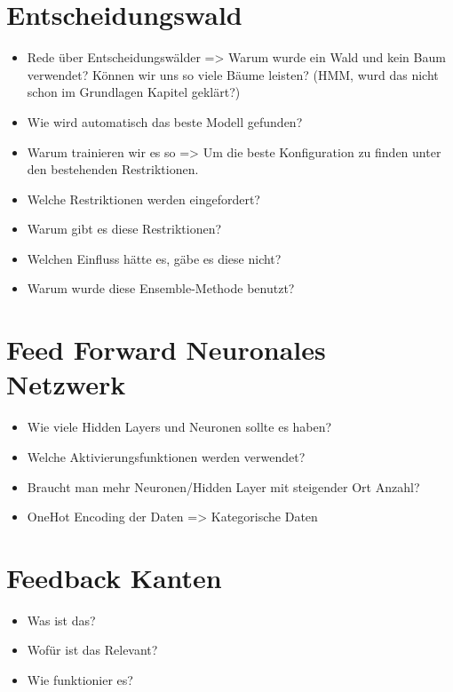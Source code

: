 \section{Entscheidungswald}
\begin{itemize}
    \item Rede über Entscheidungswälder => Warum wurde ein Wald und kein Baum verwendet? Können wir uns so viele Bäume leisten? (HMM, wurd das nicht schon im Grundlagen Kapitel geklärt?)
    \item Wie wird automatisch das beste Modell gefunden?
    \item Warum trainieren wir es so => Um die beste Konfiguration zu finden unter den bestehenden Restriktionen.
    \item Welche Restriktionen werden eingefordert?
    \item Warum gibt es diese Restriktionen?
    \item Welchen Einfluss hätte es, gäbe es diese nicht?
    \item Warum wurde diese Ensemble-Methode benutzt?
\end{itemize}

\section{Feed Forward Neuronales Netzwerk}
\begin{itemize}
    \item Wie viele Hidden Layers und Neuronen sollte es haben?
    \item Welche Aktivierungsfunktionen werden verwendet?
    \item Braucht man mehr Neuronen/Hidden Layer mit steigender Ort Anzahl?
    \item OneHot Encoding der Daten => Kategorische Daten
\end{itemize}

\section{Feedback Kanten}
\begin{itemize}
    \item Was ist das?
    \item Wofür ist das Relevant?
    \item Wie funktionier es?
\end{itemize}


